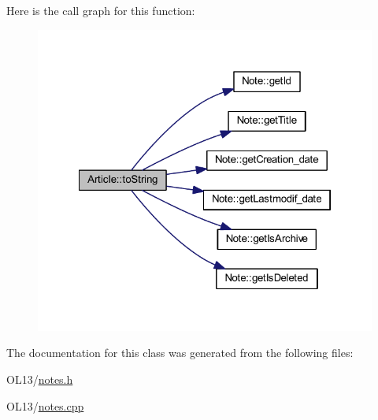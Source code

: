 Here is the call graph for this function\+:\nopagebreak
\begin{figure}[H]
\begin{center}
\leavevmode
\includegraphics[width=322pt]{class_article_ae40d268ecffbaaa549968a81ea609ba4_cgraph}
\end{center}
\end{figure}


The documentation for this class was generated from the following files\+:\begin{DoxyCompactItemize}
\item 
O\+L13/\hyperlink{notes_8h}{notes.\+h}\item 
O\+L13/\hyperlink{notes_8cpp}{notes.\+cpp}\end{DoxyCompactItemize}
